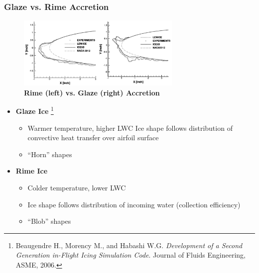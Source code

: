 \documentclass[9pt]{beamer}
\begin{document}
\begin{frame}
\frametitle{Glaze vs. Rime Accretion}

\begin{figure}
  \centering
  \includegraphics[width=0.7\textwidth]{RimeGlazeIce.png} \\
  {\bf Rime (left) vs. Glaze (right) Accretion}
\end{figure}

\begin{itemize}
\item \textbf{Glaze Ice} \footnote{Beaugendre H., Morency M., and Habashi W.G. \emph{Development of a Second Generation in-Flight Icing Simulation Code}. Journal of
Fluids Engineering, ASME, 2006.
 }
\begin{itemize}
\item Warmer temperature, higher LWC
\iten Ice shape follows distribution of convective heat transfer over airfoil surface
\item ``Horn'' shapes
\end{itemize}
\item \textbf{Rime Ice}
\begin{itemize}
\item Colder temperature, lower LWC 
\item Ice shape follows distribution of incoming water (collection efficiency)
\item ``Blob'' shapes
\end{itemize}
\end{itemize}
\end{frame}
\end{document}
